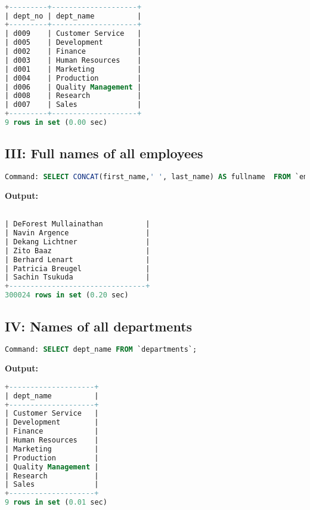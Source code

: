 \documentclass[12pt]{report}
\begin{document}
\begin{lstlisting}[language=sql]

+---------+--------------------+
| dept_no | dept_name          |
+---------+--------------------+
| d009    | Customer Service   |
| d005    | Development        |
| d002    | Finance            |
| d003    | Human Resources    |
| d001    | Marketing          |
| d004    | Production         |
| d006    | Quality Management |
| d008    | Research           |
| d007    | Sales              |
+---------+--------------------+
9 rows in set (0.00 sec)

\end{lstlisting}

\subsection*{III: Full names of all employees}

\begin{lstlisting}[language=sql]
Command: SELECT CONCAT(first_name,' ', last_name) AS fullname  FROM `employees`;
\end{lstlisting}
\textbf{Output:}

\begin{lstlisting}[language=sql]

| DeForest Mullainathan          |
| Navin Argence                  |
| Dekang Lichtner                |
| Zito Baaz                      |
| Berhard Lenart                 |
| Patricia Breugel               |
| Sachin Tsukuda                 |
+--------------------------------+
300024 rows in set (0.20 sec)

\end{lstlisting}


\subsection*{IV: Names of all departments}

\begin{lstlisting}[language=sql]
Command: SELECT dept_name FROM `departments`;
\end{lstlisting}
\textbf{Output:}

\begin{lstlisting}[language=sql]
+--------------------+
| dept_name          |
+--------------------+
| Customer Service   |
| Development        |
| Finance            |
| Human Resources    |
| Marketing          |
| Production         |
| Quality Management |
| Research           |
| Sales              |
+--------------------+
9 rows in set (0.01 sec)
\end{lstlisting}
\end{document}
